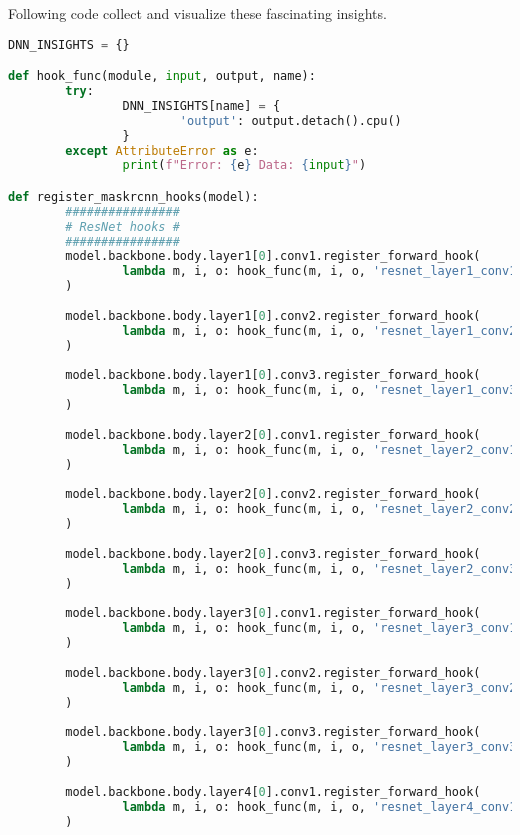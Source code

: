 	\FloatBarrier
	
	
	\iffalse
	Following code collect and visualize these fascinating insights.

	\begin{lstlisting}[language=Python,caption=Hooking insight informations from Mask R-CNN, label=lst:inference-insight]
DNN_INSIGHTS = {}

def hook_func(module, input, output, name):
		try:
				DNN_INSIGHTS[name] = {
						'output': output.detach().cpu()
				}
		except AttributeError as e:
				print(f"Error: {e} Data: {input}")

def register_maskrcnn_hooks(model):
		################
		# ResNet hooks #
		################
		model.backbone.body.layer1[0].conv1.register_forward_hook(
				lambda m, i, o: hook_func(m, i, o, 'resnet_layer1_conv1')
		)
		
		model.backbone.body.layer1[0].conv2.register_forward_hook(
				lambda m, i, o: hook_func(m, i, o, 'resnet_layer1_conv2')
		)
		
		model.backbone.body.layer1[0].conv3.register_forward_hook(
				lambda m, i, o: hook_func(m, i, o, 'resnet_layer1_conv3')
		)
		
		model.backbone.body.layer2[0].conv1.register_forward_hook(
				lambda m, i, o: hook_func(m, i, o, 'resnet_layer2_conv1')
		)
		
		model.backbone.body.layer2[0].conv2.register_forward_hook(
				lambda m, i, o: hook_func(m, i, o, 'resnet_layer2_conv2')
		)
		
		model.backbone.body.layer2[0].conv3.register_forward_hook(
				lambda m, i, o: hook_func(m, i, o, 'resnet_layer2_conv3')
		)
		
		model.backbone.body.layer3[0].conv1.register_forward_hook(
				lambda m, i, o: hook_func(m, i, o, 'resnet_layer3_conv1')
		)
		
		model.backbone.body.layer3[0].conv2.register_forward_hook(
				lambda m, i, o: hook_func(m, i, o, 'resnet_layer3_conv2')
		)
		
		model.backbone.body.layer3[0].conv3.register_forward_hook(
				lambda m, i, o: hook_func(m, i, o, 'resnet_layer3_conv3')
		)
		
		model.backbone.body.layer4[0].conv1.register_forward_hook(
				lambda m, i, o: hook_func(m, i, o, 'resnet_layer4_conv1')
		)
		

\end{lstlisting}
